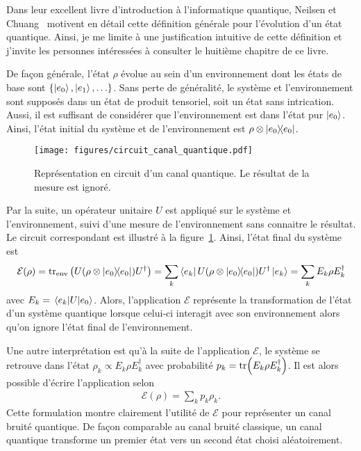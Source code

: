 Dans leur excellent livre d'introduction à l'informatique quantique, 
Neilsen et Chuang~\cite{nielsen_quantum_2010} motivent en détail 
cette définition générale pour l'évolution d'un état quantique.
Ainsi, je me limite à une justification intuitive de cette définition
et j'invite les personnes intéressées à consulter le huitième chapitre de ce livre.

De façon générale,
l'état $\rho$ évolue au sein d'un environnement dont les états de base 
sont $\qty{\ket{e_0}, \ket{e_1}, \ldots}$.
Sans perte de généralité,
le système et l'environnement sont supposés dans un état de produit tensoriel,
soit un état sans intrication.
Aussi, il est suffisant de considérer que l'environnement est dans l'état 
pur $\ket{e_0}$.
Ainsi,
l'état initial du système et de l'environnement est $\rho \otimes \op{e_0}$.

\begin{figure}
  \begin{center}
    \texttt{[image: figures/circuit\_canal\_quantique.pdf]}
  \end{center}
  \caption[Représentation en circuit d'un canal quantique]{
    Représentation en circuit d'un canal quantique.
    Le résultat de la mesure est ignoré.
  }
  \label{fig:circuit_canal_quantique}
\end{figure}

Par la suite,
un opérateur unitaire $U$ est appliqué sur le système et l'environnement,
suivi d'une mesure de l'environnement sans connaitre le résultat.
Le circuit correspondant est illustré à la figure~\ref{fig:circuit_canal_quantique}.
Ainsi, l'état final du système est
\begin{equation}
  \mathcal{E}(\rho) 
  = \tr_{\text{env}}\qty(U(\rho \otimes \op{e_0})U^\dag)
  = \sum_k \bra{e_k}U(\rho \otimes \op{e_0}) U^\dag \ket{e_k}
  = \sum_k E_k \rho E_k^\dag
\end{equation}
avec $E_k = \mel{e_k}{U}{e_0}$.
Alors,
l'application $\mathcal{E}$ représente la transformation de l'état d'un système quantique
lorsque celui-ci interagit avec son environnement alors qu'on ignore l'état final
de l'environnement.

Une autre interprétation est qu'à la suite de l'application $\mathcal E$,
le système se retrouve dans l'état $\rho_k \propto E_k \rho E_k^\dag$
avec probabilité $p_k = \tr(E_k \rho E_k^\dag)$.
Il est alors possible d'écrire l'application selon
\begin{align}
  \mathcal E(\rho) = \sum_k p_k \rho_k.
\end{align}
Cette formulation montre clairement l'utilité de $\mathcal E$ pour
représenter un canal bruité quantique.
De façon comparable au canal bruité classique,
un canal quantique transforme un premier état 
vers un second état choisi aléatoirement.

